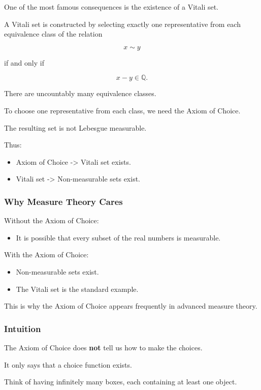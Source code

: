 \documentclass[11pt]{article}
\begin{document}
One of the most famous consequences is the existence of a Vitali set.

A Vitali set is constructed by selecting exactly one representative from each equivalence class of the relation

\[
x \sim y
\]

if and only if

\[
x-y \in \mathbb{Q}.
\]

There are uncountably many equivalence classes.

To choose one representative from each class, we need the Axiom of Choice.

The resulting set is not Lebesgue measurable.

Thus:

\begin{itemize}
\item Axiom of Choice
-> Vitali set exists.
\item Vitali set
-> Non-measurable sets exist.
\end{itemize}
\subsubsection{Why Measure Theory Cares}
\label{sec:org197e0c6}

Without the Axiom of Choice:

\begin{itemize}
\item It is possible that every subset of the real numbers is measurable.
\end{itemize}

With the Axiom of Choice:

\begin{itemize}
\item Non-measurable sets exist.
\item The Vitali set is the standard example.
\end{itemize}

This is why the Axiom of Choice appears frequently in advanced measure theory.
\subsubsection{Intuition}
\label{sec:org5105cbc}

The Axiom of Choice does \textbf{not} tell us how to make the choices.

It only says that a choice function exists.

Think of having infinitely many boxes, each containing at least one object.
\end{document}
